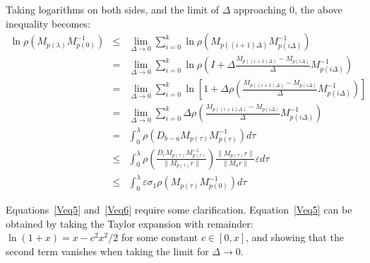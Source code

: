 \documentclass[11pt]{article}
\newcommand{\e}{\varepsilon}
\newcommand{\s}{\sigma}
\renewcommand{\l}{\lambda}
\begin{document}
Taking logarithms on both sides, and the limit of $\Delta$ approaching $0$, the above inequality becomes:
\begin{eqnarray}
 \ln\rho(M_{p(\l)} M_{p(0)}^{-1}) & \le & \displaystyle{\lim_{\Delta\rightarrow 0} \sum_{i=0}^{k} \ln\rho(M_{p((i+1)\Delta)} M_{p(i\Delta)}^{-1})} \\
 					  & = & \displaystyle{\lim_{\Delta\rightarrow 0} \sum_{i=0}^{k} \ln\rho(I + \Delta \frac{M_{p((i+1)\Delta)} - M_{p(i\Delta)}}{\Delta} M_{p(i\Delta)}^{-1}) } \\
				    & = & \displaystyle{\lim_{\Delta\rightarrow 0} \sum_{i=0}^{k} \ln\left[ 1 + \Delta \rho(\frac{M_{p((i+1)\Delta)} - M_{p(i\Delta)}}{\Delta} M_{p(i\Delta)}^{-1}) \right] } \\
\label{Veq5}			    & = & \displaystyle{\lim_{\Delta\rightarrow 0} \sum_{i=0}^{k} \Delta \rho(\frac{M_{p((i+1)\Delta)} - M_{p(i\Delta)}}{\Delta} M_{p(i\Delta)}^{-1}) } \\
\label{Veq6}		         & = & \displaystyle{ \int_{0}^{\l} \rho(D_{b-a} M_{p(\tau)} M_{p(\tau)}^{-1}) d\tau } \\
				         & \le & \displaystyle{ \int_{0}^{\l} \rho(\frac{D_r M_{p(\tau)} M_{p(\tau)}^{-1}}{\|M_{p(\tau)} r\|}) \frac{\|M_{p(\tau)} r\|}{\|M_a r\|} \e d\tau } \\
				         & \le & \displaystyle{ \int_{0}^{\l} \e\s_1 \rho(M_{p(\tau)} M_{p(0)}^{-1}) d\tau}
\end{eqnarray}

Equations~\ref{Veq5} and~\ref{Veq6} require some clarification. 
Equation~\ref{Veq5} can be obtained by taking the Taylor expansion with remainder:
	$\ln(1+x)=x - c^2 x^2/2$ for some constant $c\in[0,x]$, and showing that the second term vanishes when taking the limit for $\Delta\rightarrow 0$. 
\end{document}
